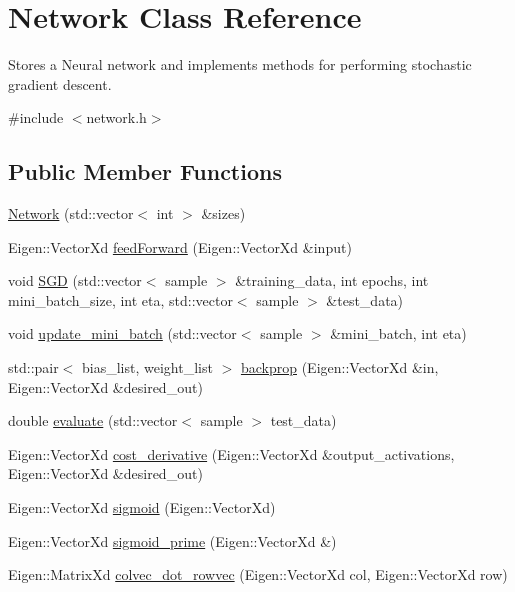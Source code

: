 \hypertarget{classNetwork}{}\section{Network Class Reference}
\label{classNetwork}


Stores a Neural network and implements methods for performing stochastic gradient descent.  




{\ttfamily \#include $<$network.\+h$>$}

\subsection*{Public Member Functions}
\begin{DoxyCompactItemize}
\item 
\hyperlink{classNetwork_aa6382995a4a0bc915d12d794eb584adf}{Network} (std\+::vector$<$ int $>$ \&sizes)
\item 
Eigen\+::\+Vector\+Xd \hyperlink{classNetwork_a4fba84f6e70a7c89fff90091efd51679}{feed\+Forward} (Eigen\+::\+Vector\+Xd \&input)
\item 
void \hyperlink{classNetwork_acdb38726769a9f571f09a5f10f6b6847}{S\+GD} (std\+::vector$<$ sample $>$ \&training\+\_\+data, int epochs, int mini\+\_\+batch\+\_\+size, int eta, std\+::vector$<$ sample $>$ \&test\+\_\+data)
\item 
void \hyperlink{classNetwork_af736bbf264f09be714d5961ef670a5cb}{update\+\_\+mini\+\_\+batch} (std\+::vector$<$ sample $>$ \&mini\+\_\+batch, int eta)
\item 
std\+::pair$<$ bias\+\_\+list, weight\+\_\+list $>$ \hyperlink{classNetwork_a657a8db0aad5e948118f188b19d8584c}{backprop} (Eigen\+::\+Vector\+Xd \&in, Eigen\+::\+Vector\+Xd \&desired\+\_\+out)
\item 
double \hyperlink{classNetwork_a062ac4352c92fc2bd88b51bbc29c25a4}{evaluate} (std\+::vector$<$ sample $>$ test\+\_\+data)
\item 
Eigen\+::\+Vector\+Xd \hyperlink{classNetwork_a108865a0ac7351810451cf9ee60b57ed}{cost\+\_\+derivative} (Eigen\+::\+Vector\+Xd \&output\+\_\+activations, Eigen\+::\+Vector\+Xd \&desired\+\_\+out)
\item 
Eigen\+::\+Vector\+Xd \hyperlink{classNetwork_a1d50530a35db77496d47d5662154830a}{sigmoid} (Eigen\+::\+Vector\+Xd)
\item 
Eigen\+::\+Vector\+Xd \hyperlink{classNetwork_a8569e18257ede199f14febf93e44968f}{sigmoid\+\_\+prime} (Eigen\+::\+Vector\+Xd \&)
\item 
Eigen\+::\+Matrix\+Xd \hyperlink{classNetwork_a97f385db3fd78d16a73a7f8b2d18f968}{colvec\+\_\+dot\+\_\+rowvec} (Eigen\+::\+Vector\+Xd col, Eigen\+::\+Vector\+Xd row)
\end{DoxyCompactItemize}


